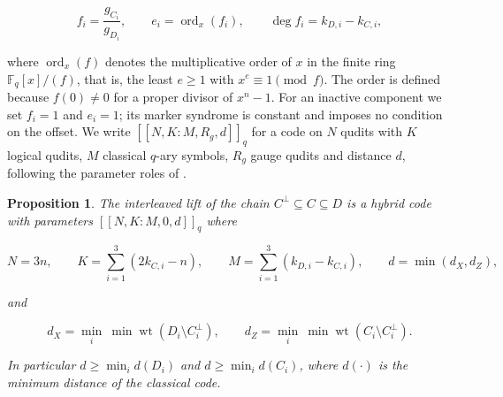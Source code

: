 \documentclass[11pt,reqno]{amsart}
\newtheorem{proposition}[theorem]{Proposition}
\theoremstyle{definition}
\theoremstyle{remark}
\newcommand{\F}{\mathbb{F}}
\newcommand{\wt}{\operatorname{wt}}
\newcommand{\ord}{\operatorname{ord}}
\begin{document}
\begin{equation}\label{eq:fi}
f_i=\frac{g_{C_i}}{g_{D_i}},\qquad e_i=\ord_x(f_i),\qquad \deg f_i=k_{D,i}-k_{C,i},
\end{equation}

where $\ord_x(f)$ denotes the multiplicative order of $x$ in the finite ring $\F_q[x]/(f)$, that is, the least $e\ge1$ with $x^e\equiv1\pmod f$. The order is defined because $f(0)\neq0$ for a proper divisor of $x^n-1$. For an inactive component we set $f_i=1$ and $e_i=1$; its marker syndrome is constant and imposes no condition on the offset. We write $[[N,K:M,R_g,d]]_q$ for a code on $N$ qudits with $K$ logical qudits, $M$ classical $q$-ary symbols, $R_g$ gauge qudits and distance $d$, following the parameter roles of \cite{TansuwannontNemec2026}.


\begin{proposition}\label{params}
The interleaved lift of the chain $C^\perp\subseteq C\subseteq D$ is a hybrid code with parameters $[[N,K:M,0,d]]_q$ where

\begin{equation}\label{eq:params}
N=3n,\qquad K=\sum_{i=1}^{3}(2k_{C,i}-n),\qquad M=\sum_{i=1}^{3}(k_{D,i}-k_{C,i}),\qquad d=\min(d_X,d_Z),
\end{equation}

and

\begin{equation}\label{eq:dist}
d_X=\min_i\ \min\wt(D_i\setminus C_i^\perp),\qquad d_Z=\min_i\ \min\wt(C_i\setminus C_i^\perp).
\end{equation}

In particular $d\ge\min_i d(D_i)$ and $d\ge\min_i d(C_i)$, where $d(\cdot)$ is the minimum distance of the classical code.
\end{proposition}
\end{document}
